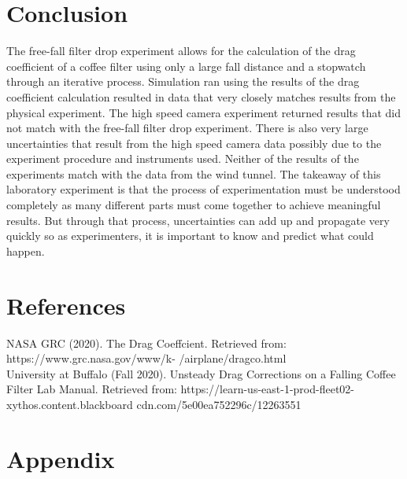 \documentclass[12pt]{report}
\begin{document}
\section*{Conclusion}

The free-fall filter drop experiment allows for the calculation of the drag coefficient of a coffee filter using only a large fall distance and a stopwatch through an iterative process. Simulation ran using the results of the drag coefficient calculation resulted in data that very closely matches results from the physical experiment. The high speed camera experiment returned results that did not match with the free-fall filter drop experiment. There is also very large uncertainties that result from the high speed camera data possibly due to the experiment procedure and instruments used. Neither of the results of the experiments match with the data from the wind tunnel. The takeaway of this laboratory experiment is that the process of experimentation must be understood completely as many different parts must come together to achieve meaningful results. But through that process, uncertainties can add up and propagate very quickly so as experimenters, it is important to know and predict what could happen.

\section*{References}

\noindent [1] NASA GRC (2020). The Drag Coeffcient. Retrieved from: https://www.grc.nasa.gov/www/k-
/airplane/dragco.html\\

\noindent [2] University at Buffalo (Fall 2020). Unsteady Drag Corrections on a Falling Coffee Filter Lab 
\indent Manual. Retrieved from: https://learn-us-east-1-prod-fleet02-xythos.content.blackboard
\indent cdn.com/5e00ea752296c/12263551


\newpage
\section*{Appendix}
\end{document}
